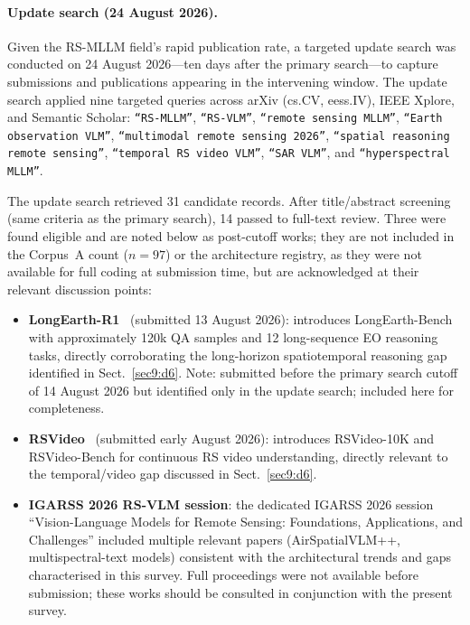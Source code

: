 \paragraph{Update search (24 August 2026).}\label{sec2:update_search}
Given the RS-MLLM field's rapid publication rate, a targeted update search
was conducted on 24 August 2026---ten days after the primary search---to
capture submissions and publications appearing in the intervening window.
The update search applied nine targeted queries across arXiv (cs.CV, eess.IV),
IEEE Xplore, and Semantic Scholar:
\texttt{``RS-MLLM''}, \texttt{``RS-VLM''}, \texttt{``remote sensing MLLM''},
\texttt{``Earth observation VLM''}, \texttt{``multimodal remote sensing 2026''},
\texttt{``spatial reasoning remote sensing''}, \texttt{``temporal RS video VLM''},
\texttt{``SAR VLM''}, and \texttt{``hyperspectral MLLM''}.

The update search retrieved 31 candidate records.
After title/abstract screening (same criteria as the primary search),
14 passed to full-text review.
Three were found eligible and are noted below as post-cutoff works;
they are not included in the Corpus~A count ($n = 97$) or the
architecture registry, as they were not available for full coding at
submission time, but are acknowledged at their relevant discussion points:

\begin{itemize}
\item \textbf{LongEarth-R1}~\cite{longearth_r1_2026} (submitted 13 August 2026):
introduces LongEarth-Bench with approximately 120k QA samples and 12
long-sequence EO reasoning tasks, directly corroborating the long-horizon
spatiotemporal reasoning gap identified in Sect.~\ref{sec9:d6}.
Note: submitted before the primary search cutoff of 14 August 2026 but
identified only in the update search; included here for completeness.

\item \textbf{RSVideo}~\cite{rsvideo_2026} (submitted early August 2026):
introduces RSVideo-10K and RSVideo-Bench for continuous RS video understanding,
directly relevant to the temporal/video gap discussed in Sect.~\ref{sec9:d6}.

\item \textbf{IGARSS 2026 RS-VLM session}: the dedicated IGARSS 2026 session
``Vision-Language Models for Remote Sensing: Foundations, Applications, and
Challenges'' included multiple relevant papers (AirSpatialVLM++, multispectral-text
models) consistent with the architectural trends and gaps characterised in this survey.
Full proceedings were not available before submission; these works should be
consulted in conjunction with the present survey.
\end{itemize}


